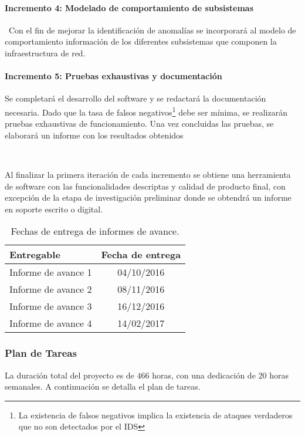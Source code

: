 \paragraph{Incremento 4: Modelado de comportamiento de subsistemas} \
Con el fin de mejorar la identificación de anomalías se incorporará al modelo de comportamiento información de los diferentes subsistemas que componen la infraestructura de red.
\paragraph{Incremento 5: Pruebas exhaustivas y documentación}
Se completará el desarrollo del software y se redactará la documentación necesaria. Dado que la tasa de falsos negativos\footnote{La existencia de falsos negativos implica la existencia de ataques verdaderos que no son detectados por el IDS} debe ser mínima, se realizarán pruebas exhaustivas de funcionamiento. Una vez concluidas las pruebas, se elaborará un informe con los resultados obtenidos

\ \

Al finalizar la primera iteración de cada incremento se obtiene una herramienta de software con las funcionalidades descriptas y calidad de producto final, con excepción de la etapa de investigación preliminar donde se obtendrá un informe en soporte escrito o digital.



\begin{table}[htbp]
	\begin{center}	
		\begin{tabular}{|l|c|}
			\hline 
			Entregable & Fecha de entrega \\ \hline
			Informe de avance 1 & 04/10/2016 \\
			Informe de avance 2 & 08/11/2016 \\
			Informe de avance 3 & 16/12/2016 \\
			Informe de avance 4 & 14/02/2017 \\ \hline
		\end{tabular}
	\end{center}
	\caption{Fechas de entrega de informes de avance.}
	\label{table:informes}
\end{table}

\subsubsection*{Plan de Tareas}

La duración total del proyecto es de $466$ horas, con una dedicación de $20$ horas semanales. A continuación se detalla el plan de tareas.

